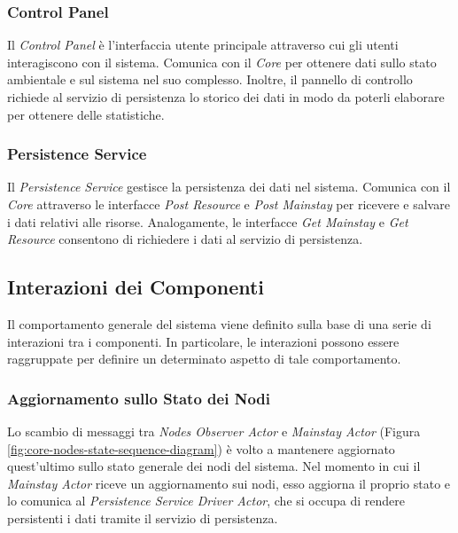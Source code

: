 \documentclass{scrartcl}
\begin{document}
\subsubsection{Control Panel}
Il \textit{Control Panel} è l'interfaccia utente principale attraverso cui gli utenti interagiscono con il sistema. Comunica con il \textit{Core} per ottenere dati sullo stato ambientale e sul sistema nel suo complesso. Inoltre, il pannello di controllo richiede al servizio di persistenza lo storico dei dati in modo da poterli elaborare per ottenere delle statistiche.

\subsubsection{Persistence Service}
Il \textit{Persistence Service} gestisce la persistenza dei dati nel sistema. Comunica con il \textit{Core} attraverso le interfacce \textit{Post Resource} e \textit{Post Mainstay} per ricevere e salvare i dati relativi alle risorse. Analogamente, le interfacce \textit{Get Mainstay} e \textit{Get Resource }consentono di richiedere i dati al servizio di persistenza.

\subsection{Interazioni dei Componenti}

Il comportamento generale del sistema viene definito sulla base di una serie di interazioni tra i componenti. In particolare, le interazioni possono essere raggruppate per definire un determinato aspetto di tale comportamento.

\subsubsection{Aggiornamento sullo Stato dei Nodi}

Lo scambio di messaggi tra \textit{Nodes Observer Actor} e \textit{Mainstay Actor} (Figura \ref{fig:core-nodes-state-sequence-diagram}) è volto a mantenere aggiornato quest'ultimo sullo stato generale dei nodi del sistema. Nel momento in cui il \textit{Mainstay Actor} riceve un aggiornamento sui nodi, esso aggiorna il proprio stato e lo comunica al \textit{Persistence Service Driver Actor}, che si occupa di rendere persistenti i dati tramite il servizio di persistenza.
\end{document}
